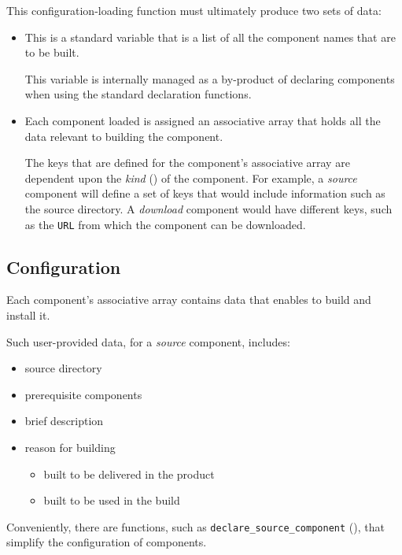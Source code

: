 This configuration-loading function must ultimately produce two sets
of data:

\begin{itemize}
\item \lmsbwcomponents

  This is a standard \gnumake variable that is a list of all the
  component names that are to be built.

  This variable is internally managed as a by-product of declaring
  components when using the standard declaration functions.

\item {}

  Each component loaded is assigned an associative array that holds
  all the data relevant to building the component.

  The keys that are defined for the component's associative array are
  dependent upon the \emph{kind} () of the
  component.  For example, a \emph{source} component will define a set
  of keys that would include information such as the source directory.
  A \emph{download} component would have different keys, such as the
  \texttt{URL} from which the component can be downloaded.
\end{itemize}


\subsection{ Configuration}

Each component's associative array contains data that enables \lmsbw
to build and install it.

Such user-provided data, for a \emph{source} component, includes:

\begin{itemize}
\item source directory
\item prerequisite components
\item brief description
\item reason for building
  \begin{itemize}
  \item built to be delivered in the product
  \item built to be used in the build
  \end{itemize}
\end{itemize}

Conveniently, there are \lmsbw functions, such as
\texttt{declare\_source\_component}
(), that simplify the configuration
of components.

